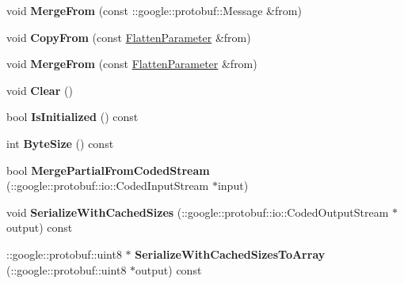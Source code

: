 \begin{DoxyCompactItemize}
void {\bfseries Merge\+From} (const \+::google\+::protobuf\+::\+Message \&from)
\item 
\mbox{\label{classcaffe_1_1_flatten_parameter_a041f1fdf0aca7175a04e164500bb1f16}} 
void {\bfseries Copy\+From} (const \mbox{\hyperlink{classcaffe_1_1_flatten_parameter}{Flatten\+Parameter}} \&from)
\item 
\mbox{\label{classcaffe_1_1_flatten_parameter_a40b5a7d14ec519448129ba2dc6f5ab86}} 
void {\bfseries Merge\+From} (const \mbox{\hyperlink{classcaffe_1_1_flatten_parameter}{Flatten\+Parameter}} \&from)
\item 
\mbox{\label{classcaffe_1_1_flatten_parameter_a99ee269aea6609c5e45551d503e44e61}} 
void {\bfseries Clear} ()
\item 
\mbox{\label{classcaffe_1_1_flatten_parameter_ac53a68c9076709b57dec2c3f675e3808}} 
bool {\bfseries Is\+Initialized} () const
\item 
\mbox{\label{classcaffe_1_1_flatten_parameter_ae4c6f9547396228edd634f296a8073e3}} 
int {\bfseries Byte\+Size} () const
\item 
\mbox{\label{classcaffe_1_1_flatten_parameter_ac8b8e88d809df711e2c5c15ef02e7167}} 
bool {\bfseries Merge\+Partial\+From\+Coded\+Stream} (\+::google\+::protobuf\+::io\+::\+Coded\+Input\+Stream $\ast$input)
\item 
\mbox{\label{classcaffe_1_1_flatten_parameter_a9674659f645422fe173da512794afa71}} 
void {\bfseries Serialize\+With\+Cached\+Sizes} (\+::google\+::protobuf\+::io\+::\+Coded\+Output\+Stream $\ast$output) const
\item 
\mbox{\label{classcaffe_1_1_flatten_parameter_ae1b3173f54c82a075fe73e746b130845}} 
\+::google\+::protobuf\+::uint8 $\ast$ {\bfseries Serialize\+With\+Cached\+Sizes\+To\+Array} (\+::google\+::protobuf\+::uint8 $\ast$output) const
\item 
\mbox{\label{classcaffe_1_1_flatten_parameter_ab4b9ef0de5fa4b11b880137c0aa4b3d8}} 

\end{DoxyCompactItemize}
